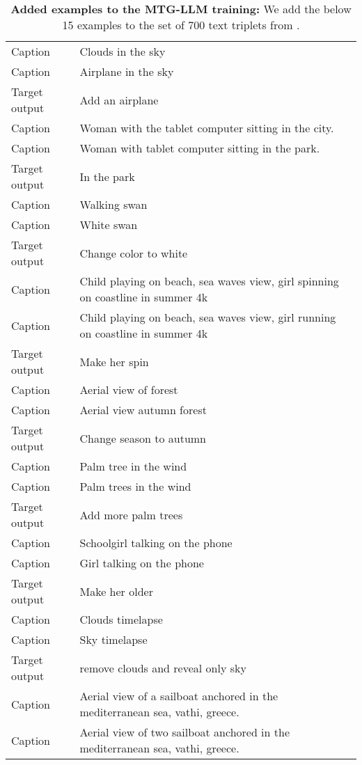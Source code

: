\begin{table}\caption{\textbf{Added examples to the MTG-LLM training:}
We add the below 15 examples to the set of 700 text triplets from \cite{brooks2022instructpix2pix}.
}
    \begin{tabular}{ll}
    \toprule
    Caption & Clouds in the sky \\
Caption & Airplane in the sky \\
Target output & Add an airplane \\
\midrule
Caption & Woman with the tablet computer sitting in the city. \\
Caption & Woman with tablet computer sitting in the park. \\
Target output & In the park \\
\midrule
Caption & Walking swan \\
Caption & White swan \\
Target output & Change color to white \\
\midrule
Caption & Child playing on beach, sea waves view, girl spinning on coastline in summer 4k \\
Caption & Child playing on beach, sea waves view, girl running on coastline in summer 4k \\
Target output & Make her spin \\
\midrule
Caption & Aerial view of forest \\
Caption & Aerial view autumn forest \\
Target output & Change season to autumn \\
\midrule
Caption & Palm tree in the wind \\
Caption & Palm trees in the wind \\
Target output & Add more palm trees \\
\midrule
Caption & Schoolgirl talking on the phone \\
Caption & Girl talking on the phone \\
Target output & Make her older \\
\midrule
Caption & Clouds timelapse \\
Caption & Sky timelapse \\
Target output & remove clouds and reveal only sky \\
\midrule
Caption & Aerial view of a sailboat anchored in the mediterranean sea, vathi, greece. \\
Caption & Aerial view of two sailboat anchored in the mediterranean sea, vathi, greece. \\

\end{tabular}
\end{table}
